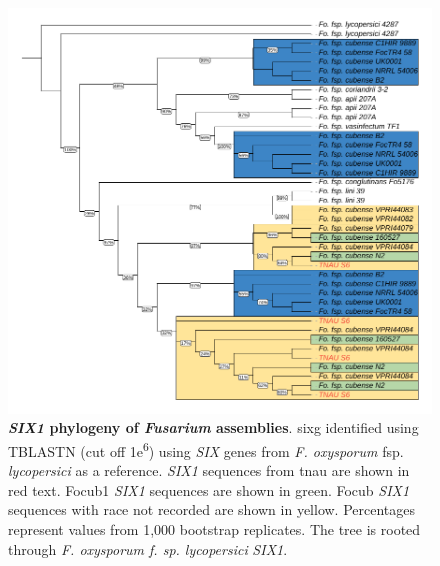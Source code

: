 \begin{figure}[htp!]
  \centering
  \includegraphics[]{Figures/FusSIX1.phylo.pdf}
  \caption[\textit{SIX1} phylogeny of \textit{Fusarium} assemblies]{\textbf{\textit{SIX1} phylogeny of \textit{Fusarium} assemblies}. \acl{sixg} identified using TBLASTN (cut off 1\-e\textsuperscript{6}) using \textit{SIX} genes from \textit{F. oxysporum} fsp. \textit{lycopersici} as a reference. \textit{SIX1} sequences from \ac{tnau} are shown in red text. \Acl{Focub1} \textit{SIX1} sequences are shown in green. \acl{Focub} \textit{SIX1} sequences with race not recorded are shown in yellow. Percentages represent values from 1,000 bootstrap replicates. The tree is rooted through \textit{F. oxysporum f. sp. lycopersici} \textit{SIX1}.}
  \label{fig:FusSIX1}
\end{figure}

